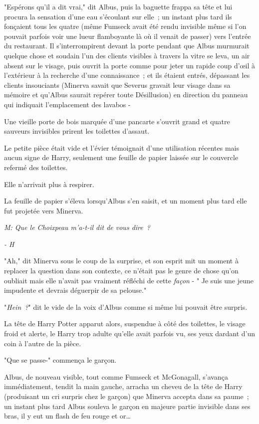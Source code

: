 "Espérons qu'il a dit vrai," dit Albus, puis la baguette frappa sa tête et lui procura la sensation d'une eau s'écoulant sur elle~; un instant plus tard ils fonçaient tous les quatre (même Fumseck avait été rendu invisible même si l'on pouvait parfois voir une lueur flamboyante là où il venait de passer) vers l'entrée du restaurant. Il s'interrompirent devant la porte pendant que Albus murmurait quelque chose et soudain l'un des clients visibles à travers la vitre se leva, un air absent sur le visage, puis ouvrit la porte comme pour jeter un rapide coup d'œil à l'extérieur à la recherche d'une connaissance~; et ils étaient entrés, dépassant les clients insouciants (Minerva savait que Severus gravait leur visage dans sa mémoire et qu'Albus saurait repérer toute Désillusion) en direction du panneau qui indiquait l'emplacement des lavabos -

Une vieille porte de bois marquée d'une pancarte s'ouvrit grand et quatre sauveurs invisibles prirent les toilettes d'assaut.

Le petite pièce était vide et l'évier témoignait d'une utilisation récentes mais aucun signe de Harry, seulement une feuille de papier laissée sur le couvercle refermé des toilettes.

Elle n'arrivait plus à respirer.

La feuille de papier s'éleva lorsqu'Albus s'en saisit, et un moment plus tard elle fut projetée vers Minerva.

\emph{M: Que le Choixpeau m'a-t-il dit de vous dire~?}

\emph{- H}

"Ah," dit Minerva sous le coup de la surprise, et son esprit mit un moment à replacer la question dans son contexte, ce n'était pas le genre de chose qu'on oubliait mais elle n'avait pas vraiment réfléchi de cette \emph{façon} - " Je suis une jeune impudente et devrais déguerpir de sa pelouse."

"\emph{Hein~?}" dit le vide de la voix d'Albus comme si même lui pouvait être surpris.

La tête de Harry Potter apparut alors, suspendue à côté des toilettes, le visage froid et alerte, le Harry trop adulte qu'elle avait parfois vu, ses yeux dardant d'un coin à l'autre de la pièce.

"Que se passe-" commença le garçon.

Albus, de nouveau visible, tout comme Fumseck et McGonagall, s'avança immédiatement, tendit la main gauche, arracha un cheveu de la tête de Harry (produisant un cri surpris chez le garçon) que Minerva accepta dans sa paume~; un instant plus tard Albus souleva le garçon en majeure partie invisible dans ses bras, il y eut un flash de feu rouge et or…

